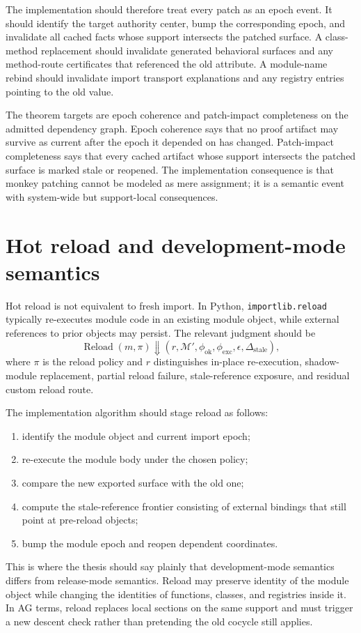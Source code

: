 \documentclass[11pt]{report}
\begin{document}
The implementation should therefore treat every patch as an epoch event. It should identify the target authority center, bump the corresponding epoch, and invalidate all cached facts whose support intersects the patched surface. A class-method replacement should invalidate generated behavioral surfaces and any method-route certificates that referenced the old attribute. A module-name rebind should invalidate import transport explanations and any registry entries pointing to the old value.

The theorem targets are epoch coherence and patch-impact completeness on the admitted dependency graph. Epoch coherence says that no proof artifact may survive as current after the epoch it depended on has changed. Patch-impact completeness says that every cached artifact whose support intersects the patched surface is marked stale or reopened. The implementation consequence is that monkey patching cannot be modeled as mere assignment; it is a semantic event with system-wide but support-local consequences.
\section{Hot reload and development-mode semantics}
Hot reload is not equivalent to fresh import. In Python, \texttt{importlib.reload} typically re-executes module code in an existing module object, while external references to prior objects may persist. The relevant judgment should be
\[
\operatorname{Reload}(m,\pi) \Downarrow (r,\mathcal{M}',\phi_{\mathrm{ok}},\phi_{\mathrm{exc}},\epsilon,\Delta_{\mathrm{stale}}),
\]
where $\pi$ is the reload policy and $r$ distinguishes in-place re-execution, shadow-module replacement, partial reload failure, stale-reference exposure, and residual custom reload route.

The implementation algorithm should stage reload as follows:
\begin{enumerate}
\item identify the module object and current import epoch;
\item re-execute the module body under the chosen policy;
\item compare the new exported surface with the old one;
\item compute the stale-reference frontier consisting of external bindings that still point at pre-reload objects;
\item bump the module epoch and reopen dependent coordinates.
\end{enumerate}
This is where the thesis should say plainly that development-mode semantics differs from release-mode semantics. Reload may preserve identity of the module object while changing the identities of functions, classes, and registries inside it. In AG terms, reload replaces local sections on the same support and must trigger a new descent check rather than pretending the old cocycle still applies.
\end{document}
